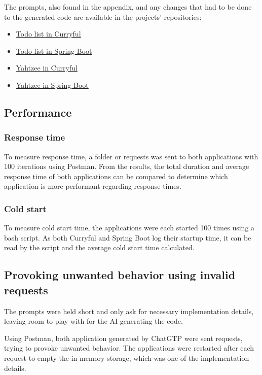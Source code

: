 \documentclass[a4paper]{article}
\begin{document}
The prompts, also found in the appendix, and any changes that had to
be done to the generated code are available in the projects' repositories:
\begin{itemize}
	\item \hyperlink{https://github.com/lerchl/curryful-bachelor-thesis-curryful-todo-list}{Todo list in Curryful}
	\item \hyperlink{https://github.com/lerchl/curryful-bachelor-thesis-spring-boot-todo-list}{Todo list in Spring Boot}
	\item \hyperlink{https://github.com/lerchl/curryful-bachelor-thesis-curryful-yahtzee}{Yahtzee in Curryful}
	\item \hyperlink{https://github.com/lerchl/curryful-bachelor-thesis-spring-boot-yahtzee}{Yahtzee in Spring Boot}
\end{itemize}

\subsection{Performance}
\subsubsection{Response time}
To measure response time, a folder or requests was sent to both applications
with 100 iterations using Postman. From the results, the total duration and
average response time of both applications can be compared to determine which
application is more performant regarding response times.

\subsubsection{Cold start}
To measure cold start time, the applications were each started 100 times using
a bash script. As both Curryful and Spring Boot log their startup time, it can
be read by the script and the average cold start time calculated.

\subsection{Provoking unwanted behavior using invalid requests}
The prompts were held short and only ask for necessary implementation details,
leaving room to play with for the AI generating the code.

Using Postman, both application generated by ChatGTP were sent requests, trying
to provoke unwanted behavior. The applications were restarted after each request
to empty the in-memory storage, which was one of the implementation details.
\end{document}
